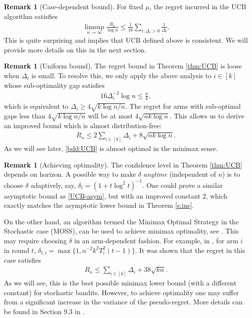 \documentclass[letterpaper,11pt,openright,openany]{book}
\numberwithin{equation}{section}
\theoremstyle{plain}
\theoremstyle{definition}
\newtheorem{Rem}[Th]{Remark}
\begin{document}
\begin{Rem}[Case-dependent bound]
For fixed $\mu$, the regret incurred in the UCB algorithm satisfies 
\begin{align}
\limsup_{n\to\infty}\frac{R_n}{\log n}\leq\frac{1}{16}\sum_{i: \Delta_i>0}\frac{1}{\Delta_i}. \label{UCB-asym}
\end{align}
This is quite surprising and implies that UCB defined above is consistent. We will provide more details on this in the next section.  
\end{Rem}

\begin{Rem}[Uniform bound]\label{UCB-uni}
The regret bound in Theorem \ref{thm:UCB} is loose when $\Delta_i$ is small. To resolve this, we only apply the above analysis to $i\in [k]$ whose sub-optimality gap satisfies
\begin{align*}
16\Delta_i^{-2}\log n\leq \frac{n}{k}, 
\end{align*}
which is equivalent to $\Delta_i\geq 4\sqrt{k\log n/n}$. The regret for arms with sub-optimal gaps less than $4\sqrt{k\log n/n}$ will be at most $4\sqrt{nk\log n}$. This allows us to derive an improved bound which is almost distribution-free: 
\begin{align}
R_n\leq 2\sum_{i\in [k]}\Delta_i + 8\sqrt{nk\log n}. \label{bdd:UCB}
\end{align} 
As we will see later, \eqref{bdd:UCB} is almost optimal in the minimax sense. 
\end{Rem}

\begin{Rem}[Achieving optimality]\label{ins-opt}
The confidence level in Theorem \ref{thm:UCB} depends on horizon. A possible way to make $\delta$ \emph{anytime} (independent of $n$) is to choose $\delta$ adaptively, say, $\delta_t = (1+t\log^2 t)^{-1}$. One could prove a similar asymptotic bound as \eqref{UCB-asym}, but with an improved constant $2$, which exactly matches the asymptotic lower bound in Theorem \ref{s:ins}.   

On the other hand, an algorithm termed the Minimax Optimal Strategy in the Stochastic case (MOSS), can be used to achieve minimax optimality, see \cite{audibert2009minimax, degenne2016anytime}. This may require choosing $\delta$ in an arm-dependent fashion. For example, in \cite{degenne2016anytime}, for arm $i$ in round $t$, $\delta_{t, i}=\max\{1, n^{-2}k^2T^2_i(t-1)\}$. It was shown that the regret in this case satisfies
\begin{align*}
R_n\leq \sum_{i\in [k]}\Delta_i+38\sqrt{kn}. 
\end{align*}
As we will see, this is the best possible minimax lower bound (with a different constant) for stochastic bandits. However, to achieve optimality one may suffer from a significant increase in the variance of the pseudo-regret. More details can be found in Section 9.3 in \cite{lattimore2018bandit}. 
\end{Rem} 
\end{document}
